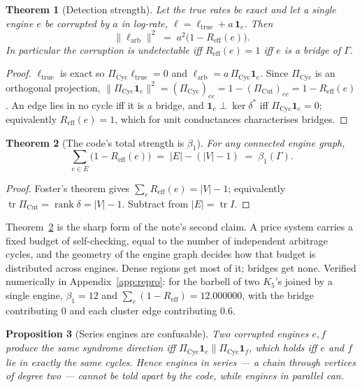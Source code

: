 \documentclass[11pt]{article}
\theoremstyle{plain}
\newtheorem{theorem}{Theorem}[section]
\newtheorem{proposition}[theorem]{Proposition}
\theoremstyle{definition}
\theoremstyle{remark}
\newcommand{\Reff}{R_{\mathrm{eff}}}
\newcommand{\bt}{\beta_1}
\newcommand{\Cyc}{\mathrm{Cyc}}
\newcommand{\Cut}{\mathrm{Cut}}
\begin{document}
\begin{theorem}[Detection strength]\label{thm:detect}
Let the true rates be exact and let a single engine $e$ be corrupted by
$a$ in log-rate, $\ell = \ell_{\mathrm{true}} + a\,\mathbf{1}_e$. Then
\[
  \| \ell_{\mathrm{arb}} \|^2 \;=\; a^2\bigl(1 - \Reff(e)\bigr).
\]
In particular the corruption is undetectable iff $\Reff(e) = 1$ iff $e$ is
a bridge of $\Gamma$.
\end{theorem}

\begin{proof}
$\ell_{\mathrm{true}}$ is exact so $\Pi_{\Cyc}\ell_{\mathrm{true}} = 0$ and
$\ell_{\mathrm{arb}} = a\,\Pi_{\Cyc}\mathbf{1}_e$. Since $\Pi_{\Cyc}$ is an
orthogonal projection,
$\|\Pi_{\Cyc}\mathbf{1}_e\|^2 = (\Pi_{\Cyc})_{ee} = 1 - (\Pi_{\Cut})_{ee}
= 1 - \Reff(e)$. An edge lies in no cycle iff it is a bridge, and
$\mathbf{1}_e \perp \ker\delta^\ast$ iff $\Pi_{\Cyc}\mathbf{1}_e = 0$;
equivalently $\Reff(e) = 1$, which for unit conductances characterises
bridges.
\end{proof}

\begin{theorem}[The code's total strength is $\bt$]\label{thm:foster}
For any connected engine graph,
\[
  \sum_{e \in E} \bigl(1 - \Reff(e)\bigr)
  \;=\; |E| - (|V| - 1) \;=\; \bt(\Gamma).
\]
\end{theorem}

\begin{proof}
Foster's theorem \cite{foster} gives $\sum_e \Reff(e) = |V| - 1$;
equivalently $\operatorname{tr}\Pi_{\Cut} = \operatorname{rank}\delta =
|V|-1$. Subtract from $|E| = \operatorname{tr} I$.
\end{proof}

Theorem~\ref{thm:foster} is the sharp form of the note's second claim. A
price system carries a fixed budget of self-checking, equal to the number
of independent arbitrage cycles, and the geometry of the engine graph
decides how that budget is distributed across engines. Dense regions get
most of it; bridges get none. Verified numerically in
Appendix~\ref{app:repro}: for the barbell of two $K_5$'s joined by a single
engine, $\bt = 12$ and $\sum_e(1-\Reff) = 12.000000$, with the bridge
contributing $0$ and each cluster edge contributing $0.6$.

\begin{proposition}[Series engines are confusable]\label{prop:series}
Two corrupted engines $e, f$ produce the same syndrome direction iff
$\Pi_{\Cyc}\mathbf{1}_e \parallel \Pi_{\Cyc}\mathbf{1}_f$, which holds iff
$e$ and $f$ lie in exactly the same cycles. Hence engines in series --- a
chain through vertices of degree two --- cannot be told apart by the code,
while engines in parallel can.
\end{proposition}
\end{document}
